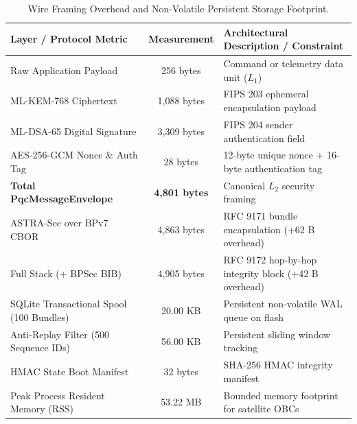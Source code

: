 \begin{table}[t]
\centering
\caption{Wire Framing Overhead and Non-Volatile Persistent Storage Footprint.}
\label{tab:wire_and_storage}
\small
\begin{tabular}{lcp{6.5cm}}
\hline
\textbf{Layer / Protocol Metric} & \textbf{Measurement} & \textbf{Architectural Description / Constraint} \\
\hline
Raw Application Payload & 256 bytes & Command or telemetry data unit ($L_1$) \\
ML-KEM-768 Ciphertext & 1,088 bytes & FIPS 203 ephemeral encapsulation payload \\
ML-DSA-65 Digital Signature & 3,309 bytes & FIPS 204 sender authentication field \\
AES-256-GCM Nonce \& Auth Tag & 28 bytes & 12-byte unique nonce + 16-byte authentication tag \\
\textbf{Total PqcMessageEnvelope} & \textbf{4,801 bytes} & Canonical $L_2$ security framing \\
ASTRA-Sec over BPv7 CBOR & 4,863 bytes & RFC 9171 bundle encapsulation (+62 B overhead) \\
Full Stack (+ BPSec BIB) & 4,905 bytes & RFC 9172 hop-by-hop integrity block (+42 B overhead) \\
\hline
SQLite Transactional Spool (100 Bundles) & 20.00 KB & Persistent non-volatile WAL queue on flash \\
Anti-Replay Filter (500 Sequence IDs) & 56.00 KB & Persistent sliding window tracking \\
HMAC State Boot Manifest & 32 bytes & SHA-256 HMAC integrity manifest \\
Peak Process Resident Memory (RSS) & 53.22 MB & Bounded memory footprint for satellite OBCs \\
\hline
\end{tabular}
\end{table}
